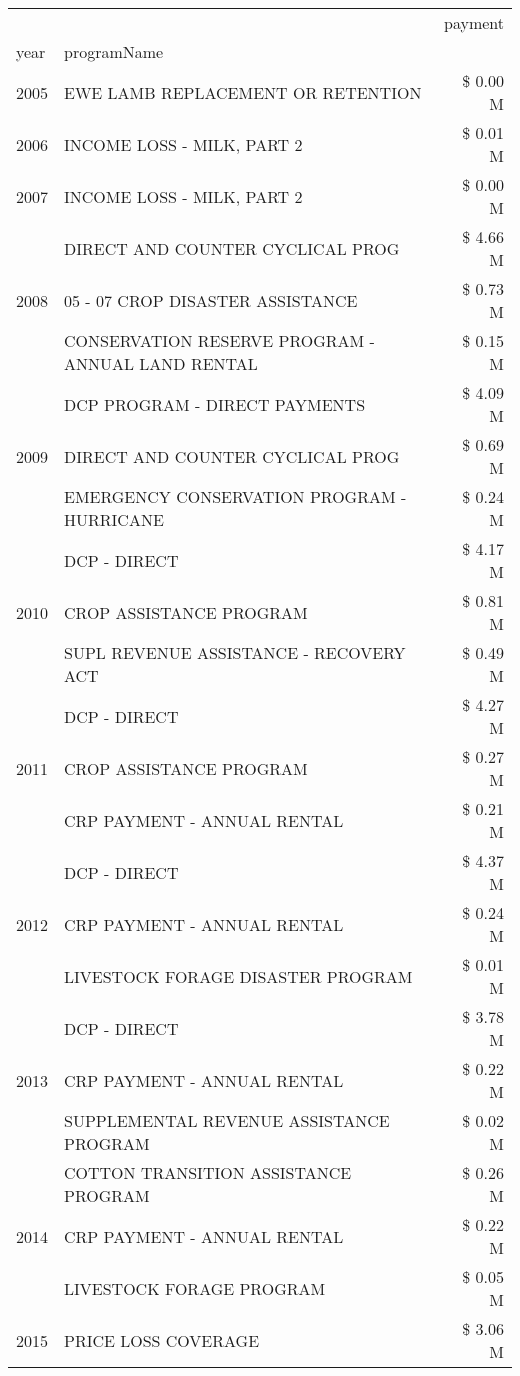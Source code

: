\begin{tabular}{llr}
\toprule
 &  & payment \\
year & programName &  \\
\midrule
2005 & EWE LAMB REPLACEMENT OR RETENTION & \$ 0.00 M \\
\cline{1-3}
2006 & INCOME LOSS - MILK, PART 2 & \$ 0.01 M \\
\cline{1-3}
2007 & INCOME LOSS - MILK, PART 2 & \$ 0.00 M \\
\cline{1-3}
\multirow[t]{3}{*}{2008} & DIRECT AND COUNTER CYCLICAL PROG & \$ 4.66 M \\
 & 05 - 07 CROP DISASTER ASSISTANCE & \$ 0.73 M \\
 & CONSERVATION RESERVE PROGRAM - ANNUAL LAND RENTAL & \$ 0.15 M \\
\cline{1-3}
\multirow[t]{3}{*}{2009} & DCP PROGRAM - DIRECT PAYMENTS & \$ 4.09 M \\
 & DIRECT AND COUNTER CYCLICAL PROG & \$ 0.69 M \\
 & EMERGENCY CONSERVATION PROGRAM - HURRICANE & \$ 0.24 M \\
\cline{1-3}
\multirow[t]{3}{*}{2010} & DCP - DIRECT & \$ 4.17 M \\
 & CROP ASSISTANCE PROGRAM & \$ 0.81 M \\
 & SUPL REVENUE ASSISTANCE - RECOVERY ACT & \$ 0.49 M \\
\cline{1-3}
\multirow[t]{3}{*}{2011} & DCP - DIRECT & \$ 4.27 M \\
 & CROP ASSISTANCE PROGRAM & \$ 0.27 M \\
 & CRP PAYMENT - ANNUAL RENTAL & \$ 0.21 M \\
\cline{1-3}
\multirow[t]{3}{*}{2012} & DCP - DIRECT & \$ 4.37 M \\
 & CRP PAYMENT - ANNUAL RENTAL & \$ 0.24 M \\
 & LIVESTOCK FORAGE DISASTER PROGRAM & \$ 0.01 M \\
\cline{1-3}
\multirow[t]{3}{*}{2013} & DCP - DIRECT & \$ 3.78 M \\
 & CRP PAYMENT - ANNUAL RENTAL & \$ 0.22 M \\
 & SUPPLEMENTAL REVENUE ASSISTANCE PROGRAM & \$ 0.02 M \\
\cline{1-3}
\multirow[t]{3}{*}{2014} & COTTON TRANSITION ASSISTANCE PROGRAM & \$ 0.26 M \\
 & CRP PAYMENT - ANNUAL RENTAL & \$ 0.22 M \\
 & LIVESTOCK FORAGE PROGRAM & \$ 0.05 M \\
\cline{1-3}
\multirow[t]{3}{*}{2015} & PRICE LOSS COVERAGE & \$ 3.06 M \\

\end{tabular}
